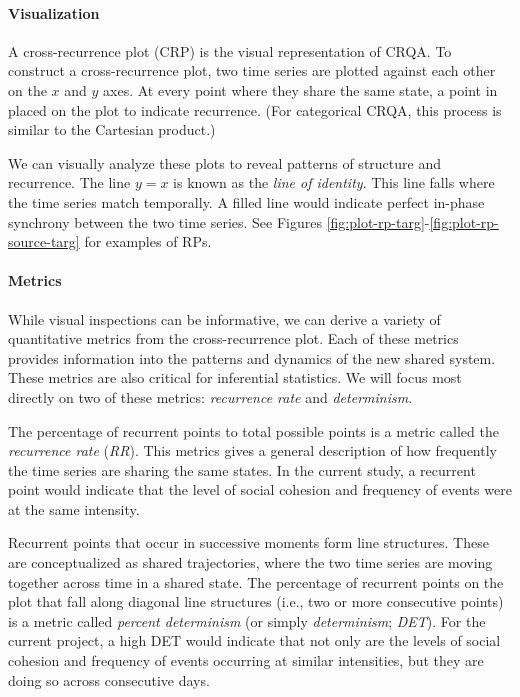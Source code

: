 \documentclass[english,man]{apa6}
\begin{document}
\hypertarget{visualization}{%
\paragraph{Visualization}\label{visualization}}

A cross-recurrence plot (CRP) is the visual representation of CRQA. To construct
a cross-recurrence plot, two time series are plotted against each other on the
\(x\) and \(y\) axes. At every point where they share the same state, a point in
placed on the plot to indicate recurrence. (For categorical CRQA, this process
is similar to the Cartesian product.)

We can visually analyze these plots to reveal patterns of structure and
recurrence. The line \(y = x\) is known as the \emph{line of identity}. This line falls
where the time series match temporally. A filled line would indicate perfect
in-phase synchrony between the two time series. See Figures
\ref{fig:plot-rp-targ}-\ref{fig:plot-rp-source-targ} for examples of
RPs.

\hypertarget{metrics}{%
\paragraph{Metrics}\label{metrics}}

While visual inspections can be informative, we can derive a variety of
quantitative metrics from the cross-recurrence plot. Each of these metrics
provides information into the patterns and dynamics of the new shared system.
These metrics are also critical for inferential statistics. We will focus most
directly on two of these metrics: \emph{recurrence rate} and \emph{determinism}.

The percentage of recurrent points to total possible points is a metric called
the \emph{recurrence rate} (\emph{RR}). This metrics gives a general description of how
frequently the time series are sharing the same states. In the current study, a
recurrent point would indicate that the level of social cohesion and frequency
of events were at the same intensity.

Recurrent points that occur in successive moments form line structures. These
are conceptualized as shared trajectories, where the two time series are moving
together across time in a shared state. The percentage of recurrent points on
the plot that fall along diagonal line structures (i.e., two or more consecutive
points) is a metric called \emph{percent determinism} (or simply \emph{determinism};
\emph{DET}). For the current project, a high DET would indicate that not only are the
levels of social cohesion and frequency of events occurring at similar
intensities, but they are doing so across consecutive days.
\end{document}
